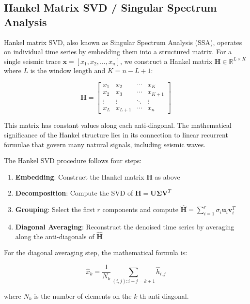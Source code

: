 \documentclass[10pt,twocolumn]{article}
\begin{document}
\subsection{Hankel Matrix SVD / Singular Spectrum Analysis}
Hankel matrix SVD, also known as Singular Spectrum Analysis (SSA), operates on individual time series by embedding them into a structured matrix. For a single seismic trace $\mathbf{x} = [x_1, x_2, \ldots, x_n]$, we construct a Hankel matrix $\mathbf{H} \in \mathbb{R}^{L \times K}$ where $L$ is the window length and $K = n - L + 1$:

\begin{equation}
\mathbf{H} = 
\begin{bmatrix}
x_1 & x_2 & \cdots & x_K \\
x_2 & x_3 & \cdots & x_{K+1} \\
\vdots & \vdots & \ddots & \vdots \\
x_L & x_{L+1} & \cdots & x_n
\end{bmatrix}
\end{equation}

This matrix has constant values along each anti-diagonal. The mathematical significance of the Hankel structure lies in its connection to linear recurrent formulae that govern many natural signals, including seismic waves.

The Hankel SVD procedure follows four steps:
\begin{enumerate}
\item \textbf{Embedding}: Construct the Hankel matrix $\mathbf{H}$ as above
\item \textbf{Decomposition}: Compute the SVD of $\mathbf{H} = \mathbf{U} \mathbf{\Sigma} \mathbf{V}^T$
\item \textbf{Grouping}: Select the first $r$ components and compute $\mathbf{\hat{H}} = \sum_{i=1}^{r} \sigma_i \mathbf{u}_i \mathbf{v}_i^T$
\item \textbf{Diagonal Averaging}: Reconstruct the denoised time series by averaging along the anti-diagonals of $\mathbf{\hat{H}}$
\end{enumerate}

For the diagonal averaging step, the mathematical formula is:

\begin{equation}
\hat{x}_k = \frac{1}{N_k} \sum_{(i,j): i+j=k+1} \hat{h}_{i,j}
\end{equation}

where $N_k$ is the number of elements on the $k$-th anti-diagonal.
\end{document}
